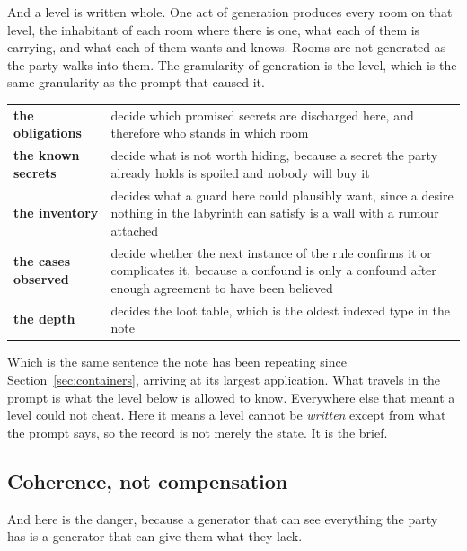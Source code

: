 \documentclass[11pt,a4paper]{article}
\begin{document}
And a level is written whole. One act of generation produces every room on that level, the
inhabitant of each room where there is one, what each of them is carrying, and what each of them
wants and knows. Rooms are not generated as the party walks into them. The granularity of
generation is the level, which is the same granularity as the prompt that caused it.

\begin{center}
\begin{tabular}{@{}l@{\hspace{4mm}}>{\raggedright\arraybackslash}p{}@{}}
\toprule
\textbf{the obligations}   & decide which promised secrets are discharged here, and therefore who
stands in which room \\[1mm]
\textbf{the known secrets} & decide what is not worth hiding, because a secret the party already
holds is spoiled and nobody will buy it \\[1mm]
\textbf{the inventory}     & decides what a guard here could plausibly want, since a desire nothing
in the labyrinth can satisfy is a wall with a rumour attached \\[1mm]
\textbf{the cases observed} & decide whether the next instance of the rule confirms it or complicates
it, because a confound is only a confound after enough agreement to have been believed \\[1mm]
\textbf{the depth}         & decides the loot table, which is the oldest indexed type in the note \\
\bottomrule
\end{tabular}
\end{center}

\begin{sectionbox}
Which is the same sentence the note has been repeating since Section~\ref{sec:containers}, arriving
at its largest application. What travels in the prompt is what the level below is allowed to know.
Everywhere else that meant a level could not cheat. Here it means a level cannot be \emph{written}
except from what the prompt says, so the record is not merely the state. It is the brief.
\end{sectionbox}

\subsection{Coherence, not compensation}
\label{sec:coherence}

And here is the danger, because a generator that can see everything the party has is a generator
that can give them what they lack.
\end{document}
